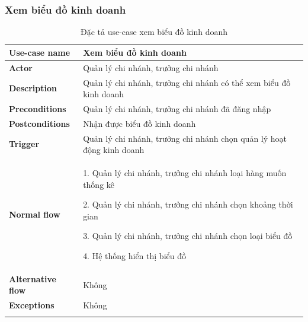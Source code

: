 \subsubsection{Xem biểu đồ kinh doanh}
{
    \setlength\extrarowheight{6pt}
    \begin{longtable}{| p{} | p{} |}
        \hline
        \textbf{Use-case name}
         &
        Xem biểu đồ kinh doanh
        \\
        \hline
        \textbf{Actor}
         &
        Quản lý chi nhánh, trưởng chi nhánh
        \\
        \hline
        \textbf{Description}
         &
        Quản lý chi nhánh, trưởng chi nhánh có thể xem biểu đồ kinh doanh
        \\
        \hline
        \textbf{Preconditions}
         &
        Quản lý chi nhánh, trưởng chi nhánh đã đăng nhập
        \\
        \hline
        \textbf{Postconditions}
         &
        Nhận được biểu đồ kinh doanh
        \\
        \hline
        \textbf{Trigger}
         &
        Quản lý chi nhánh, trưởng chi nhánh chọn quản lý hoạt động kinh doanh
        \\
        \hline
        \begin{flushleft}
            \textbf{Normal flow}
        \end{flushleft}
         &
        1. Quản lý chi nhánh, trưởng chi nhánh loại hàng muốn thống kê

        2. Quản lý chi nhánh, trưởng chi nhánh chọn khoảng thời gian

        3. Quản lý chi nhánh, trưởng chi nhánh chọn loại biểu đồ

        4. Hệ thống hiển thị biểu đồ
        \\
        \hline
        \textbf{Alternative flow}
         &
        Không
        \\
        \hline
        \textbf{Exceptions}
         &
        Không
        \\
        \hline
        \caption{Đặc tả use-case xem biểu đồ kinh doanh}
    \end{longtable}
}



